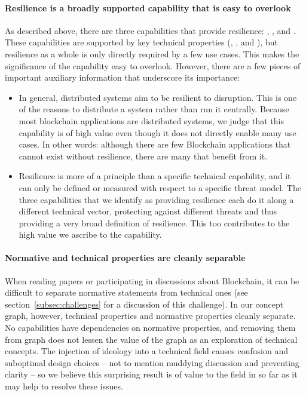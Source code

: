 {\paragraph{Resilience is a broadly supported capability that is easy to overlook}
As described above, there are three capabilities that provide resilience: , , and . These capabilities are supported by key technical properties (, , and ), but resilience as a whole is only directly required by a few use cases. This makes the significance of the capability easy to overlook. However, there are a few pieces of important auxiliary information that underscore its importance:

\begin{itemize}
	\item In general, distributed systems aim to be resilient to disruption. This is one of the reasons to distribute a system rather than run it centrally. Because most blockchain applications are distributed systems, we judge that this capability is of high value even though it does not directly enable many use cases. In other words: although there are few Blockchain applications that cannot exist without resilience, there are many that benefit from it.
	\item Resilience is more of a principle than a specific technical capability, and it can only be defined or measured with respect to a specific threat model. The three capabilities that we identify as providing resilience each do it along a different technical vector, protecting against different threats and thus providing a very broad definition of resilience. This too contributes to the high value we ascribe to the capability.
\end{itemize}

\paragraph{Normative and technical properties are cleanly separable}
When reading papers or participating in discussions about Blockchain, it can be difficult to separate normative statements from technical ones (see section~\ref{subsec:challenges} for a discussion of this challenge). In our concept graph, however, technical properties and normative properties cleanly separate. No capabilities have dependencies on normative properties, and removing them from graph does not lessen the value of the graph as an exploration of technical concepts. The injection of ideology into a technical field causes confusion and suboptimal design choices -- not to mention muddying discussion and preventing clarity -- so we believe this surprising result is of value to the field in so far as it may help to resolve these issues.

}
